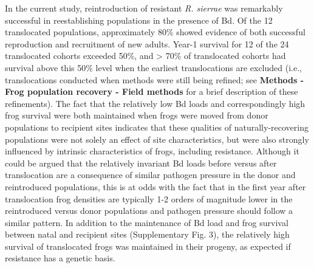 \documentclass[
  letterpaper,
  DIV=11,
  numbers=noendperiod]{scrartcl}
\begin{document}
In the current study, reintroduction of resistant \emph{R. sierrae} was
remarkably successful in reestablishing populations in the presence of
Bd. Of the 12 translocated populations, approximately 80\% showed
evidence of both successful reproduction and recruitment of new adults.
Year-1 survival for 12 of the 24 translocated cohorts exceeded 50\%, and
\textgreater{} 70\% of translocated cohorts had survival above this 50\%
level when the earliest translocations are excluded (i.e.,
translocations conducted when methods were still being refined; see
\textbf{Methods - Frog population recovery - Field methods} for a brief
description of these refinements). The fact that the relatively low Bd
loads and correspondingly high frog survival were both maintained when
frogs were moved from donor populations to recipient sites indicates
that these qualities of naturally-recovering populations were not solely
an effect of site characteristics, but were also strongly influenced by
intrinsic characteristics of frogs, including resistance. Although it
could be argued that the relatively invariant Bd loads before versus
after translocation are a consequence of similar pathogen pressure in
the donor and reintroduced populations, this is at odds with the fact
that in the first year after translocation frog densities are typically
1-2 orders of magnitude lower in the reintroduced versus donor
populations and pathogen pressure should follow a similar pattern. In
addition to the maintenance of Bd load and frog survival between natal
and recipient sites (Supplementary Fig. 3), the relatively high survival
of translocated frogs was maintained in their progeny, as expected if
resistance has a genetic basis.
\end{document}
